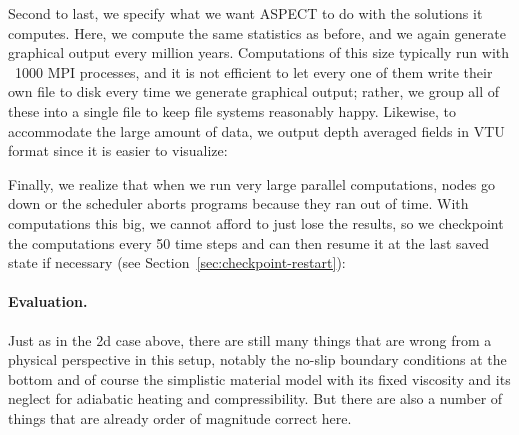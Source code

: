 \documentclass{article}
\newcommand{\aspect}{\textsc{ASPECT}}
\begin{document}


Second to last, we specify what we want \aspect{} to do with the solutions it
computes. Here, we compute the same statistics as before, and we again generate
graphical output every million years. Computations of this size typically run
with ~1000 MPI processes, and it is not efficient to let every one of them write
their own file to disk every time we generate graphical output; rather, we group
all of these into a single file to keep file systems reasonably happy. Likewise,
to accommodate the large amount of data, we output depth averaged fields in VTU
format since it is easier to visualize:



Finally, we realize that when we run very large parallel computations, nodes go
down or the scheduler aborts programs because they ran out of time. With
computations this big, we cannot afford to just lose the results, so we
checkpoint the computations every 50 time steps and can then resume it at the
last saved state if necessary (see Section~\ref{sec:checkpoint-restart}):






\paragraph{Evaluation.}
Just as in the 2d case above, there are still many things that are wrong from a
physical perspective in this setup, notably the no-slip boundary conditions at
the bottom and of course the simplistic material model with its fixed viscosity
and its neglect for adiabatic heating and compressibility.
But there are also a number of things that are already order of magnitude
correct here.
\end{document}
